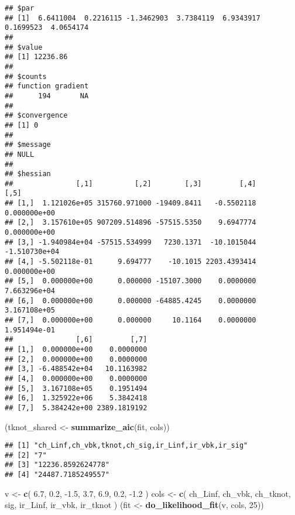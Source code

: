 \documentclass[
]{article}
\newenvironment{Shaded}{\begin{snugshade}}{\end{snugshade}}
\newcommand{\DecValTok}[1]{\textcolor[rgb]{0.00,0.00,0.81}{#1}}
\newcommand{\FloatTok}[1]{\textcolor[rgb]{0.00,0.00,0.81}{#1}}
\newcommand{\KeywordTok}[1]{\textcolor[rgb]{0.13,0.29,0.53}{\textbf{#1}}}
\newcommand{\NormalTok}[1]{#1}
\newcommand{\StringTok}[1]{\textcolor[rgb]{0.31,0.60,0.02}{#1}}
\begin{document}
\begin{verbatim}
## $par
## [1]  6.6411004  0.2216115 -1.3462903  3.7384119  6.9343917  0.1699523  4.0654174
## 
## $value
## [1] 12236.86
## 
## $counts
## function gradient 
##      194       NA 
## 
## $convergence
## [1] 0
## 
## $message
## NULL
## 
## $hessian
##               [,1]          [,2]        [,3]         [,4]          [,5]
## [1,]  1.121026e+05 315760.971000 -19409.8411   -0.5502118  0.000000e+00
## [2,]  3.157610e+05 907209.514896 -57515.5350    9.6947774  0.000000e+00
## [3,] -1.940984e+04 -57515.534999   7230.1371  -10.1015044 -1.510730e+04
## [4,] -5.502118e-01      9.694777    -10.1015 2203.4393414  0.000000e+00
## [5,]  0.000000e+00      0.000000 -15107.3000    0.0000000  7.663296e+04
## [6,]  0.000000e+00      0.000000 -64885.4245    0.0000000  3.167108e+05
## [7,]  0.000000e+00      0.000000     10.1164    0.0000000  1.951494e-01
##               [,6]         [,7]
## [1,]  0.000000e+00    0.0000000
## [2,]  0.000000e+00    0.0000000
## [3,] -6.488542e+04   10.1163982
## [4,]  0.000000e+00    0.0000000
## [5,]  3.167108e+05    0.1951494
## [6,]  1.325922e+06    5.3842418
## [7,]  5.384242e+00 2389.1819192
\end{verbatim}

\begin{Shaded}
\begin{Highlighting}[]
\NormalTok{(tknot\_shared \textless{}{-}}\StringTok{ }\KeywordTok{summarize\_aic}\NormalTok{(fit, cols))}
\end{Highlighting}
\end{Shaded}

\begin{verbatim}
## [1] "ch_Linf,ch_vbk,tknot,ch_sig,ir_Linf,ir_vbk,ir_sig"
## [2] "7"                                                
## [3] "12236.8592624778"                                 
## [4] "24487.7185249557"
\end{verbatim}

\begin{Shaded}
\begin{Highlighting}[]
\NormalTok{v \textless{}{-}}\StringTok{ }\KeywordTok{c}\NormalTok{(}
  \FloatTok{6.7}\NormalTok{, }\FloatTok{0.2}\NormalTok{, }\FloatTok{{-}1.5}\NormalTok{,  }\FloatTok{3.7}\NormalTok{,}
  \FloatTok{6.9}\NormalTok{,  }\FloatTok{0.2}\NormalTok{, }\FloatTok{{-}1.2}
\NormalTok{) }
\NormalTok{cols \textless{}{-}}\StringTok{ }\KeywordTok{c}\NormalTok{(}
  \StringTok{\textquotesingle{}ch\_Linf\textquotesingle{}}\NormalTok{, }\StringTok{\textquotesingle{}ch\_vbk\textquotesingle{}}\NormalTok{, }\StringTok{\textquotesingle{}ch\_tknot\textquotesingle{}}\NormalTok{, }\StringTok{\textquotesingle{}sig\textquotesingle{}}\NormalTok{,}
  \StringTok{\textquotesingle{}ir\_Linf\textquotesingle{}}\NormalTok{, }\StringTok{\textquotesingle{}ir\_vbk\textquotesingle{}}\NormalTok{, }\StringTok{\textquotesingle{}ir\_tknot\textquotesingle{}}
\NormalTok{)}
\NormalTok{(fit \textless{}{-}}\StringTok{ }\KeywordTok{do\_likelihood\_fit}\NormalTok{(v, cols, }\DecValTok{25}\NormalTok{))}
\end{Highlighting}
\end{Shaded}
\end{document}
